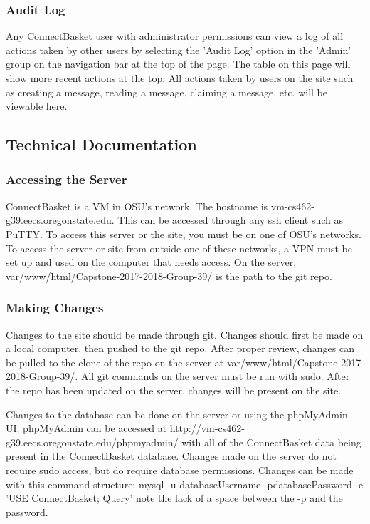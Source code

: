 \documentclass[onecolumn, draftclsnofoot,10pt, compsoc]{IEEEtran}
\begin{document}
\subsubsection{Audit Log}
Any ConnectBasket user with administrator permissions can view a log of all actions taken by other users by selecting the 'Audit Log' option in the 'Admin' group on the navigation bar at the top of the page. The table on this page will show more recent actions at the top. All actions taken by users on the site such as creating a message, reading a message, claiming a message, etc. will be viewable here.

\subsection{Technical Documentation}

\subsubsection{Accessing the Server}
ConnectBasket is a VM in OSU's network. The hostname is vm-cs462-g39.eecs.oregonstate.edu. This can be accessed through any ssh client such as PuTTY. To access this server or the site, you must be on one of OSU's networks. To access the server or site from outside one of these networks, a VPN must be set up and used on the computer that needs access. On the server, var/www/html/Capstone-2017-2018-Group-39/ is the path to the git repo.

\subsubsection{Making Changes}
Changes to the site should be made through git. Changes should first be made on a local computer, then pushed to the git repo. After proper review, changes can be pulled to the clone of the repo on the server at var/www/html/Capstone-2017-2018-Group-39/. All git commands on the server must be run with sudo. After the repo has been updated on the server, changes will be present on the site.

Changes to the database can be done on the server or using the phpMyAdmin UI. phpMyAdmin can be accessed at http://vm-cs462-g39.eecs.oregonstate.edu/phpmyadmin/ with all of the ConnectBasket data being present in the ConnectBasket database. Changes made on the server do not require sudo access, but do require database permissions. Changes can be made with this command structure: mysql -u databaseUsername -pdatabasePassword -e 'USE ConnectBasket; Query' note the lack of a space between the -p and the password.
\end{document}
